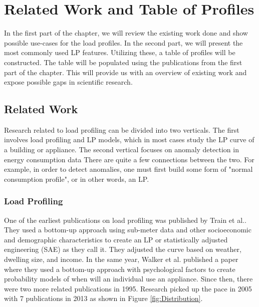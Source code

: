 \chapter{Related Work and Table of Profiles}
\label{chapter2}

In the first part of the chapter, we will review the existing work done and show possible use-cases for the load profiles.  
In the second part, we will present the most commonly used LP features.
Utilizing these, a table of profiles will be constructed.
The table will be populated using the publications from the first part of the chapter.
This will provide us with an overview of existing work and expose possible gaps in scientific research.

\section{Related Work}
\label{sec:related_work}
Research related to load profiling can be divided into two verticals.
The first involves load profiling and LP models, which in most cases study the LP curve of a building or appliance.
The second vertical focuses on anomaly detection in energy consumption data
There are quite a few connections between the two. 
For example, in order to detect anomalies, one must first build some form of "normal consumption profile", or in other words, an LP.

\subsection{Load Profiling}

One of the earliest publications on load profiling was published by Train et al.\cite{TRAIN19851103}.
They used a bottom-up approach using sub-meter data and other socioeconomic and demographic characteristics 
to create an LP or statistically adjusted engineering (SAE) as they call it.
They adjusted the curve based on weather, dwelling size, and income. 
In the same year, Walker et al.\cite{WALKER1985} published a paper where they used a bottom-up approach with psychological factors to create probability models of when will an individual use an appliance.
Since then, there were two more related publications in 1995.
Research picked up the pace in 2005 with 7 publications in 2013 as shown in Figure \ref{fig:Distribution}.

